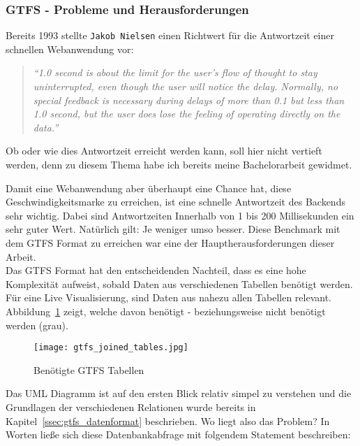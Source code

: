 \subsubsection{GTFS - Probleme und Herausforderungen}
\label{ssub:gtfs_probleme_und_herausforderungen}
   Bereits 1993 stellte \texttt{Jakob Nielsen} einen Richtwert für die Antwortzeit einer schnellen Webanwendung vor:

  \begin{quote}
    \textit{"`1.0 second is about the limit for the user's flow of thought to stay uninterrupted, even though the user will notice the delay. Normally, no special feedback is necessary during delays of more than 0.1 but less than 1.0 second, but the user does lose the feeling of operating directly on the data."'}\parencite{nielsen}
  \end{quote}

  Ob oder wie dies Antwortzeit erreicht werden kann, soll hier nicht vertieft werden, denn zu diesem Thema habe ich bereits meine Bachelorarbeit gewidmet\parencite{lorer}.

  Damit eine Webanwendung aber überhaupt eine Chance hat, diese Geschwindigkeitsmarke zu erreichen, ist eine schnelle Antwortzeit des Backends sehr wichtig. Dabei sind Antwortzeiten Innerhalb von 1 bis 200 Millisekunden ein sehr guter Wert. Natürlich gilt: Je weniger umso besser. Diese Benchmark mit dem GTFS Format zu erreichen war eine der Hauptherausforderungen dieser Arbeit.\\

  Das GTFS Format hat den entscheidenden Nachteil, dass es eine hohe Komplexität aufweist, sobald Daten aus verschiedenen Tabellen benötigt werden. Für eine Live Visualisierung, sind Daten aus nahezu allen Tabellen relevant. Abbildung~\ref{fig:gtfs_joined_tables} zeigt, welche davon benötigt - beziehungsweise nicht benötigt werden (grau).

  \begin{figure}[ht]
    \begin{center}
      \texttt{[image: gtfs\_joined\_tables.jpg]}
      \caption{Benötigte GTFS Tabellen\parencite{google_gtfs_reference}}
      \label{fig:gtfs_joined_tables}
    \end{center}
  \end{figure}

  Das UML Diagramm ist auf den ersten Blick relativ simpel zu verstehen und die Grundlagen der verschiedenen Relationen wurde bereits in Kapitel~\ref{ssec:gtfs_datenformat} beschrieben. Wo liegt also das Problem? In Worten ließe sich diese Datenbankabfrage mit folgendem Statement beschreiben: 

